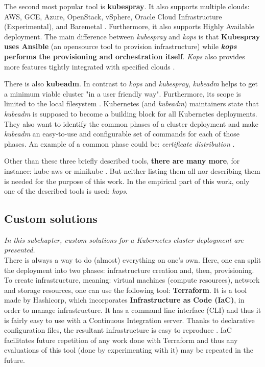 The second most popular tool is \textbf{kubespray}. It also supports multiple clouds: AWS, GCE, Azure, OpenStack, vSphere, Oracle Cloud Infrastructure (Experimental), and Baremetal \cite{online-ks}. Furthermore, it also supports Highly Available deployment. The main difference between \textit{kubespray} and \textit{kops} is that \textbf{Kubespray uses Ansible} (an opensource tool to provision infrastructure) while \textbf{\textit{kops} performs the provisioning and orchestration itself}. \textit{Kops} also provides more features tightly integrated with specified clouds \cite{online-ks-comp}.

There is also \textbf{kubeadm}. In contrast to \textit{kops} and \textit{kubespray}, \textit{kubeadm} helps to get a minimum viable cluster "in a user friendly way". Furthermore, its scope is limited to the local filesystem \cite{online-kubeadm}. Kubernetes (and \textit{kubeadm}) maintainers state that \textit{kubeadm} is supposed to become a building block for all Kubernetes deployments. They also want to identify the common phases of a cluster deployment and make \textit{kubeadm} an easy-to-use and configurable set of commands for each of those phases. An example of a common phase could be: \textit{certificate distribution} \cite{kubeadm-vision-2017}.

Other than these three briefly described tools, \textbf{there are many more}, for instance: kube-aws \cite{kube-aws} or minikube \cite{minikube}. But neither listing them all nor describing them is needed for the purpose of this work. In the empirical part of this work, only one of the described tools is used: \textit{kops}.

\subsection{Custom solutions}
\textit{In this subchapter, custom solutions for a Kubernetes cluster deployment are presented.}
\\

There is always a way to do (almost) everything on one's own. Here, one can split the deployment into two phases: infrastructure creation and, then, provisioning. To create infrastructure, meaning: virtual machines (compute resources), network and storage resources, one can use the following tool: \textbf{Terraform}. It is a tool made by Hashicorp, which incorporates \textbf{Infrastructure as Code (IaC)}, in order to manage infrastructure. It has a command line interface (CLI) and thus it is fairly easy to use with a Continuous Integration server. Thanks to declarative configuration files, the resultant infrastructure is easy to reproduce \cite{terraform}. IaC facilitates future repetition of any work done with Terraform and thus any evaluations of this tool (done by experimenting with it) may be repeated in the future.

